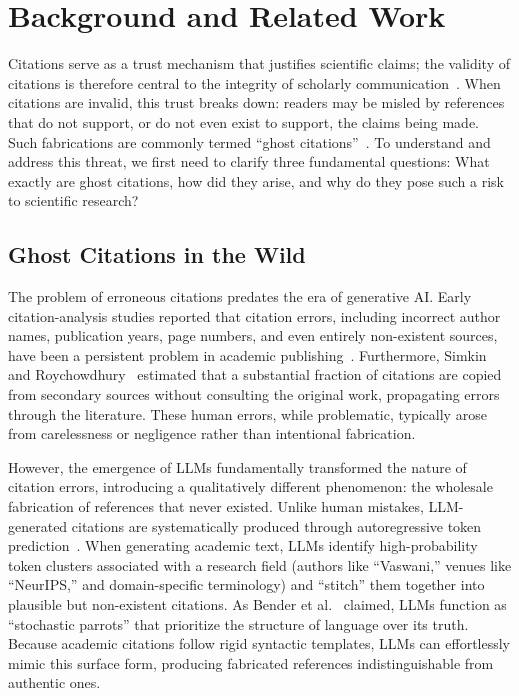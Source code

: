 \section{Background and Related Work}
\label{sec:background}

Citations serve as a trust mechanism that justifies scientific claims; the validity of citations is therefore central to the integrity of scholarly communication~\cite{greenberg2009how}.
When citations are invalid, this trust breaks down: readers may be misled by references that do not support, or do not even exist to support, the claims being made.
Such fabrications are commonly termed ``ghost citations''~\cite{consultmu2026ghost,zoteroforum2018ghost,tay2025why}.
To understand and address this threat, we first need to clarify three fundamental questions: What exactly are ghost citations, how did they arise, and why do they pose such a risk to scientific research?

\subsection{Ghost Citations in the Wild}
\label{sec:background:ghost}
The problem of erroneous citations predates the era of generative AI.
Early citation-analysis studies reported that citation errors, including incorrect author names, publication years, page numbers, and even entirely non-existent sources, have been a persistent problem in academic publishing~\cite{sweetland1989errors}.
Furthermore, Simkin and Roychowdhury~\cite{simkin2005stochastic} estimated that a substantial fraction of citations are copied from secondary sources without consulting the original work, propagating errors through the literature.
These human errors, while problematic, typically arose from carelessness or negligence rather than intentional fabrication.

However, the emergence of LLMs fundamentally transformed the nature of citation errors, introducing a qualitatively different phenomenon: the wholesale fabrication of references that never existed\cite{oladokun2025hallucitation}.
Unlike human mistakes, LLM-generated citations are systematically produced through autoregressive token prediction~\cite{vaswani2017attention,bengio2003neural}.
When generating academic text, LLMs identify high-probability token clusters associated with a research field (authors like ``Vaswani,'' venues like ``NeurIPS,'' and domain-specific terminology) and ``stitch'' them together into plausible but non-existent citations.
As Bender et al.~\cite{bender2021dangers} claimed, LLMs function as ``stochastic parrots'' that prioritize the structure of language over its truth.
Because academic citations follow rigid syntactic templates, LLMs can effortlessly mimic this surface form, producing fabricated references indistinguishable from authentic ones.

